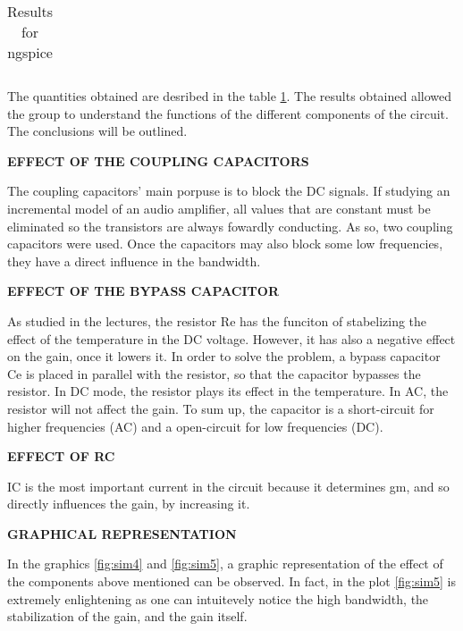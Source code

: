 \begin{enumerate}
\begin{table}[ht]
  \centering
  \begin{tabular}{|l|r|}
    \hline    
   
    \end{tabular}
  \caption{Results for ngspice}
    \label{tab:results}
\end{table}


The quantities obtained are desribed in the table \ref{tab:results}. The results obtained allowed the group to understand the functions of the different components of the circuit. 
The conclusions will be outlined.


 \textbf{EFFECT OF THE COUPLING CAPACITORS}

The coupling capacitors' main porpuse is to block the DC signals. If studying an incremental model of an audio amplifier, all values that are constant must be eliminated so the transistors are always fowardly conducting. As so, two coupling capacitors were used. Once the capacitors may also block some low frequencies, they have a direct influence in the bandwidth.



 \textbf{EFFECT OF THE BYPASS CAPACITOR}
 
  As studied in the lectures, the resistor Re has the funciton of stabelizing the effect of the temperature in the DC voltage. However, it has also a negative effect on the gain, once it lowers it. In order to solve the problem, a bypass capacitor Ce is placed in parallel with the resistor, so that the capacitor bypasses the resistor. In DC mode, the resistor plays its effect in the temperature. In AC, the resistor will not affect the gain. To sum up, the capacitor is a short-circuit for higher frequencies (AC) and a open-circuit for low frequencies (DC).



 \textbf{EFFECT OF RC}
 
IC is the most important current in the circuit because it determines gm, and so directly influences the gain, by increasing it.

\textbf{GRAPHICAL REPRESENTATION}

In the graphics \ref{fig:sim4} and \ref{fig:sim5}, a graphic representation of the effect of the components above mentioned can be observed. In fact, in the plot \ref{fig:sim5} is extremely enlightening as one can intuitevely notice the high bandwidth, the stabilization of the gain, and the gain itself.





\end{enumerate}

